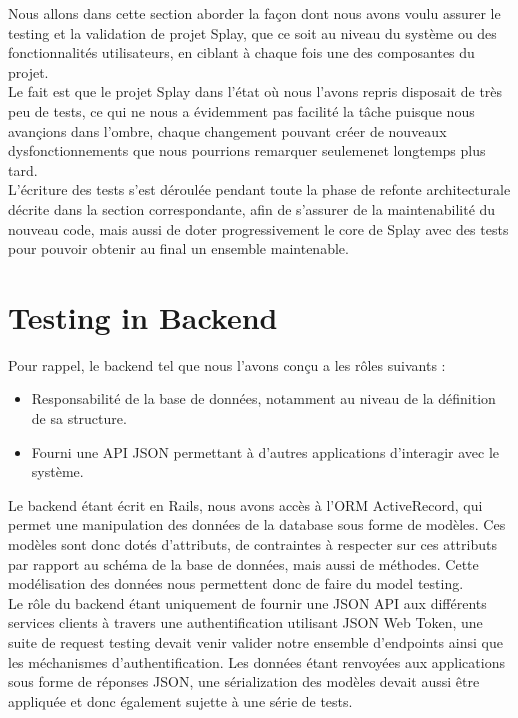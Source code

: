 \documentclass{eplmastersthesis}
\begin{document}
    Nous allons dans cette section aborder la façon dont nous avons voulu assurer
    le testing et la validation de projet Splay, que ce soit au niveau du système
    ou des fonctionnalités utilisateurs, en ciblant à chaque fois une des
    composantes du projet.\\

    Le fait est que le projet Splay dans l'état où nous l'avons repris disposait
    de très peu de tests, ce qui ne nous a évidemment pas facilité la tâche puisque
    nous avançions dans l'ombre, chaque changement pouvant créer de nouveaux
    dysfonctionnements que nous pourrions remarquer seulemenet longtemps plus tard.\\

    L'écriture des tests s'est déroulée pendant toute la phase de refonte
    architecturale décrite dans la section correspondante, afin de s'assurer
    de la maintenabilité du nouveau code, mais aussi de doter progressivement
    le core de Splay avec des tests pour pouvoir obtenir au final un ensemble
    maintenable.\\


    \section{Testing in Backend}

      Pour rappel, le backend tel que nous l'avons conçu a les rôles suivants :
      \begin{itemize}
        \item Responsabilité de la base de données, notamment au niveau de
        la définition de sa structure.
        \item Fourni une API JSON permettant à d'autres applications d'interagir
        avec le système.
      \end{itemize}

      Le backend étant écrit en Rails, nous avons accès à l'ORM ActiveRecord, qui
      permet une manipulation des données de la database sous forme de modèles.
      Ces modèles sont donc dotés d'attributs, de contraintes à respecter sur
      ces attributs par rapport au schéma de la base de données, mais aussi de
      méthodes. Cette modélisation des données nous permettent donc de faire
      du model testing.\\

      Le rôle du backend étant uniquement de fournir une JSON API
      aux différents services clients à travers une authentification utilisant
      JSON Web Token, une suite de request testing devait venir valider
      notre ensemble d'endpoints ainsi que les méchanismes d'authentification.
      Les données étant renvoyées aux applications sous forme de réponses
      JSON, une sérialization des modèles devait aussi être appliquée et donc
      également sujette à une série de tests.
\end{document}
